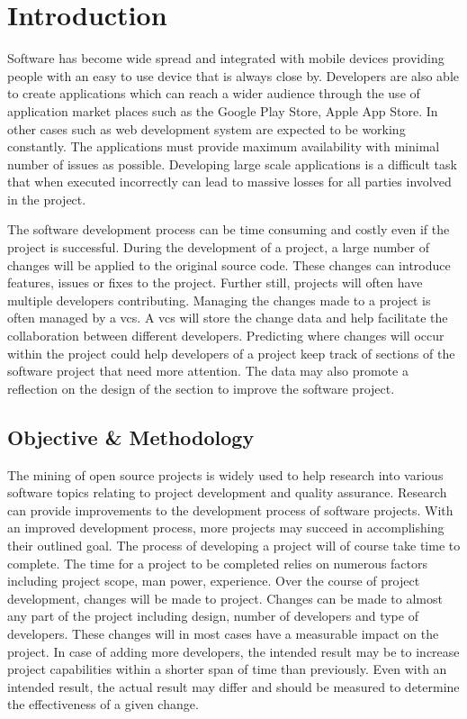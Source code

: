 \chapter{Introduction}
\label{chap:introduction}

Software has become wide spread and integrated with mobile devices providing people with an easy to use device that is always close by. Developers are also able to create applications which can reach a wider audience through the use of application market places such as the Google Play Store, Apple App Store. In other cases such as web development system are expected to be working constantly. The applications must provide maximum availability with minimal number of issues as possible. Developing large scale applications is a difficult task that when executed incorrectly can lead to massive losses for all parties involved in the project. 

The software development process can be time consuming and costly even if the project is successful. During the development of a project, a large number of changes will be applied to the original source code. These changes can introduce features, issues or fixes to the project. Further still, projects will often have multiple developers contributing. Managing the changes made to a project is often managed by a \gls{vcs}. A \gls{vcs} will store the change data and help facilitate the collaboration between different developers. Predicting where changes will occur within the project could help developers of a project keep track of sections of the software project that need more attention. The data may also promote a reflection on the design of the section to improve the software project.

\section{Objective \& Methodology}

The mining of open source projects is widely used to help research into various software topics relating to project development and quality assurance. Research can provide improvements to the development process of software projects. With an improved development process, more projects may succeed in accomplishing their outlined goal. The process of developing a project will of course take time to complete. The time for a project to be completed relies on numerous factors including project scope, man power, experience. Over the course of project development, changes will be made to project. Changes can be made to almost any part of the project including design, number of developers and type of developers. These changes will in most cases have a measurable impact on the project. In case of adding more developers, the intended result may be to increase project capabilities within a shorter span of time than previously. Even with an intended result, the actual result may differ and should be measured to determine the effectiveness of a given change.

